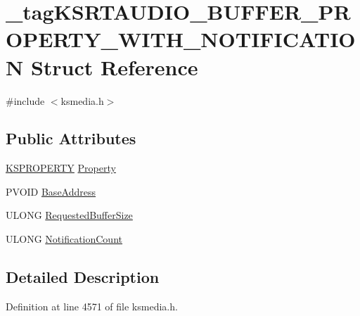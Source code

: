 \hypertarget{struct__tag_k_s_r_t_a_u_d_i_o___b_u_f_f_e_r___p_r_o_p_e_r_t_y___w_i_t_h___n_o_t_i_f_i_c_a_t_i_o_n}{}\section{\+\_\+tag\+K\+S\+R\+T\+A\+U\+D\+I\+O\+\_\+\+B\+U\+F\+F\+E\+R\+\_\+\+P\+R\+O\+P\+E\+R\+T\+Y\+\_\+\+W\+I\+T\+H\+\_\+\+N\+O\+T\+I\+F\+I\+C\+A\+T\+I\+ON Struct Reference}
\label{struct__tag_k_s_r_t_a_u_d_i_o___b_u_f_f_e_r___p_r_o_p_e_r_t_y___w_i_t_h___n_o_t_i_f_i_c_a_t_i_o_n}


{\ttfamily \#include $<$ksmedia.\+h$>$}

\subsection*{Public Attributes}
\begin{DoxyCompactItemize}
\item 
\hyperlink{ks_8h_a4392f77c74e868d813d46c39ada4d660}{K\+S\+P\+R\+O\+P\+E\+R\+TY} \hyperlink{struct__tag_k_s_r_t_a_u_d_i_o___b_u_f_f_e_r___p_r_o_p_e_r_t_y___w_i_t_h___n_o_t_i_f_i_c_a_t_i_o_n_a8a97b23de4e4019f094e30b002cde207}{Property}
\item 
P\+V\+O\+ID \hyperlink{struct__tag_k_s_r_t_a_u_d_i_o___b_u_f_f_e_r___p_r_o_p_e_r_t_y___w_i_t_h___n_o_t_i_f_i_c_a_t_i_o_n_a3eb50cb5f646c01f967b720d5b7097ff}{Base\+Address}
\item 
U\+L\+O\+NG \hyperlink{struct__tag_k_s_r_t_a_u_d_i_o___b_u_f_f_e_r___p_r_o_p_e_r_t_y___w_i_t_h___n_o_t_i_f_i_c_a_t_i_o_n_aa185c1f2a36433ec06cdde2d7cc0cb67}{Requested\+Buffer\+Size}
\item 
U\+L\+O\+NG \hyperlink{struct__tag_k_s_r_t_a_u_d_i_o___b_u_f_f_e_r___p_r_o_p_e_r_t_y___w_i_t_h___n_o_t_i_f_i_c_a_t_i_o_n_ac0b89f5dda3266eaeac251620e30ed41}{Notification\+Count}
\end{DoxyCompactItemize}


\subsection{Detailed Description}


Definition at line 4571 of file ksmedia.\+h.



